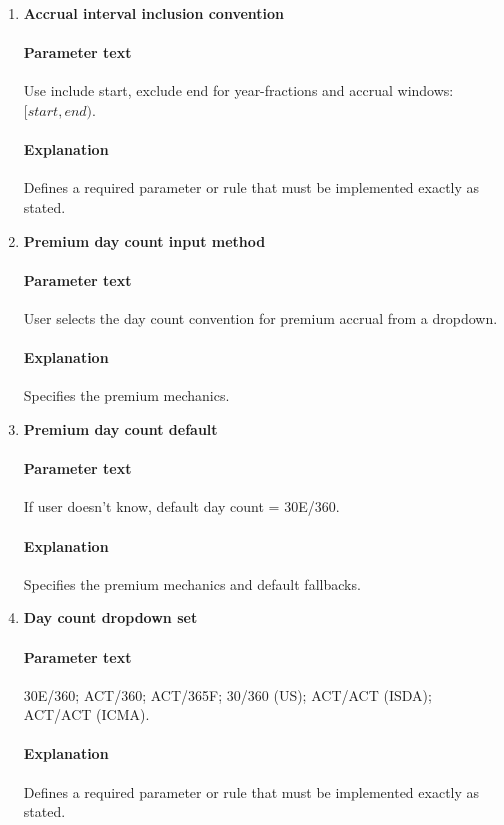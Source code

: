 \documentclass[11pt]{article}
\begin{document}
\begin{enumerate}[label=\arabic*),leftmargin=*,align=left]
\paragraph{Explanation} Defines a required parameter or rule that must be implemented exactly as stated.

\item \textbf{Accrual interval inclusion convention}
\paragraph{Parameter text} Use include start, exclude end for year-fractions and accrual windows: $[start, end)$.
\paragraph{Explanation} Defines a required parameter or rule that must be implemented exactly as stated.

\item \textbf{Premium day count input method}
\paragraph{Parameter text} User selects the day count convention for premium accrual from a dropdown.
\paragraph{Explanation} Specifies the premium mechanics.

\item \textbf{Premium day count default}
\paragraph{Parameter text} If user doesn’t know, default day count = 30E/360.
\paragraph{Explanation} Specifies the premium mechanics and default fallbacks.

\item \textbf{Day count dropdown set}
\paragraph{Parameter text} 30E/360; ACT/360; ACT/365F; 30/360 (US); ACT/ACT (ISDA); ACT/ACT (ICMA).
\paragraph{Explanation} Defines a required parameter or rule that must be implemented exactly as stated.


\end{enumerate}
\end{document}
